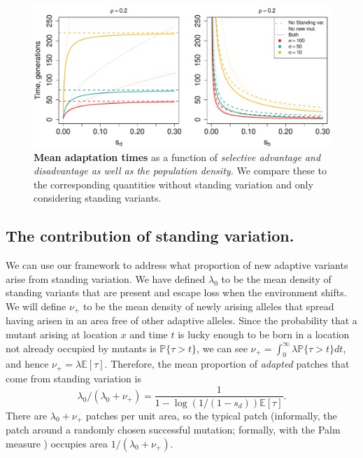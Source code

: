 \documentclass{article}
\newcommand{\gc}[1]{{\it\color{blue} #1} }
\renewcommand{\P}{\mathbb{P}}
\newcommand{\E}{\mathbb{E}}
\begin{document}
\begin{figure}[ht]
\begin{center}
  \includegraphics[width=1.0\textwidth]{G6PD_chartimes_sd_sb.pdf}   %
\caption{ %
{\bf Mean adaptation times} as a function of \gc{selective advantage and disadvantage 
as well as the population density.} We compare these to the corresponding quantities without standing variation and only considering standing variants.
} \label{G6PD_chartimes}
\end{center}
\end{figure}




\subsection{The contribution of standing variation.}
We can use our framework to address what proportion of new adaptive variants arise from standing variation.
We have defined $\lambda_0$ to be the mean density
of standing variants that are present and escape loss when the
environment shifts.
We will define $\nu_+$ to be the mean density of newly arising alleles
that spread having arisen in an area free of other adaptive alleles.
Since the probability that a mutant arising at location $x$ and time $t$ 
is lucky enough to be born in a location not already occupied by mutants
is $\P\{ \tau > t \}$,
we can see  $\nu_+ = \int_0^\infty \lambda \P\{\tau>t\} dt$, and hence
$\nu_+ = \lambda \E[\tau] $.
Therefore, the mean proportion of \gc{adapted} patches that come from standing variation
is 
\begin{equation} \label{prop_patches_standing}
\lambda_0 / (\lambda_0 + \nu_+)  = \frac{1}{1-\log(1/(1-s_d)) \E[\tau]} .
\end{equation}
There are $\lambda_0 + \nu_+$ patches per unit area, so
the typical patch (informally, the patch around a randomly chosen
successful mutation; formally, with the Palm measure
\citep{cox1980point}) occupies area $1/(\lambda_0 + \nu_+)$. 
\end{document}
